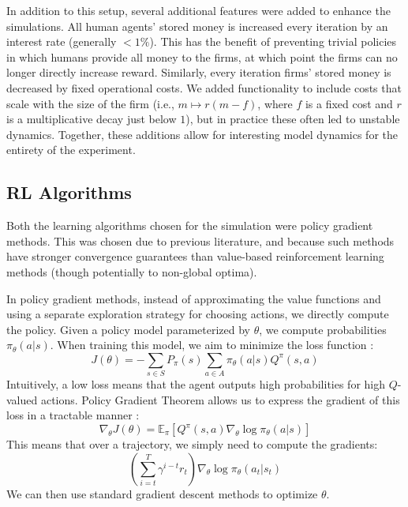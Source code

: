 \documentclass[twoside,twocolumn]{article}
\begin{document}
\medskip

In addition to this setup, several additional features were added to enhance the simulations. All human agents' stored money is increased every iteration by an interest rate (generally $<1\%$). This has the benefit of preventing trivial policies in which humans provide all money to the firms, at which point the firms can no longer directly increase reward. Similarly, every iteration firms' stored money is decreased by fixed operational costs. We added functionality to include costs that scale with the size of the firm (i.e., $m \mapsto r(m - f)$, where $f$ is a fixed cost and $r$ is a multiplicative decay just below $1$), but in practice these often led to unstable dynamics. Together, these additions allow for interesting model dynamics for the entirety of the experiment.


\subsection{RL Algorithms}
Both the learning algorithms chosen for the simulation were policy gradient methods. This was chosen due to previous literature, and because such methods have stronger convergence guarantees than value-based reinforcement learning methods (though potentially to non-global optima).

\medskip


In policy gradient methods, instead of approximating the value functions and using a separate exploration strategy for choosing actions, we directly compute the policy. Given a policy model parameterized by $\theta$, we compute probabilities $\pi_{\theta}(a|s)$. When training this model, we aim to minimize the loss function \cite{actor-critic}:
\[
J(\theta) = -\sum_{s \in S} P_{\pi}(s) \sum_{a\in A} \pi_{\theta}(a|s) Q^{\pi}(s, a)
\]
Intuitively, a low loss means that the agent outputs high probabilities for high $Q$-valued actions. Policy Gradient Theorem allows us to express the gradient of this loss in a tractable manner \cite{reinforce-lectures} \cite{actor-critic}:
\[
\nabla_{\theta} J(\theta) = \mathbb{E}_{\pi}[Q^{\pi}(s, a) \nabla_{\theta} \log \pi_{\theta}(a|s)]
\]
This means that over a trajectory, we simply need to compute the gradients:
\[
\left(\sum_{i=t}^T \gamma^{i-t} r_t\right) \nabla_{\theta} \log \pi_{\theta}(a_t|s_t)
\]
We can then use standard gradient descent methods to optimize $\theta$.

\medskip
\end{document}
